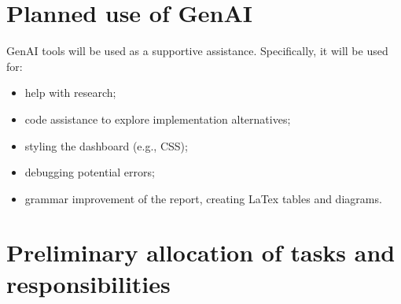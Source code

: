 \documentclass[titlepage]{article}
\begin{document}
\section{Planned use of GenAI}
GenAI tools will be used as a supportive assistance. Specifically, it will be used for:
\begin{itemize}
    \item help with research;
    \item code assistance to explore implementation alternatives;
    \item styling the dashboard (e.g., CSS);
    \item debugging potential errors;
    \item grammar improvement of the report, creating LaTex tables and diagrams.
\end{itemize}

\section{Preliminary allocation of tasks and responsibilities}

\renewcommand{\arraystretch}{1.4}
\setlength{\tabcolsep}{5pt}
\end{document}
